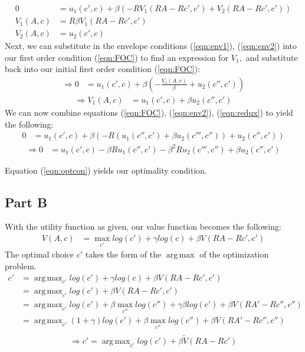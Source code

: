 \documentclass[11pt]{article} %
\DeclareMathOperator*{\argmax}{arg\,max}
\begin{document}
\begin{align}
0&= u_1(c',c) + \beta (-RV_1(RA-Rc',c') + V_2(RA-Rc',c')) \label{eqn:FOC} \\
V_1(A,c) &= R\beta V_1(RA-Rc',c') \label{eqn:env1} \\
V_2(A,c) &= u_2(c',c) \label{eqn:env2}
\end{align}
Next, we can substitute in the envelope conditions (\ref{eqn:env1}), (\ref{eqn:env2}) into our first order condition (\ref{eqn:FOC}) to find an expression for $V_1,$ and substitute back into our initial first order condition (\ref{eqn:FOC}):
\begin{align*}
\Rightarrow 0 &= u_1(c',c) + \beta \left( -\frac{V_1(A,c)}{\beta} + u_2(c'',c')\right)
\end{align*}
\begin{align}
\Rightarrow V_1(A,c) &= u_1(c',c) + \beta u_2(c'',c') \label{eqn:redux}
\end{align}
We can now combine equations (\ref{eqn:FOC}), (\ref{eqn:env2}), (\ref{eqn:redux}) to yield the following:
\begin{align*}
 0&= u_1(c',c) + \beta(-R(u_1(c'',c') + \beta u_2(c''',c'')) + u_2(c'',c'))
\end{align*}
\begin{align}
\Rightarrow 0&= u_1(c',c) - \beta R u_1(c'',c') - \beta^2 R u_2(c''',c'') + \beta u_2(c'',c') \label{eqn:optcon}
\end{align}

Equation (\ref{eqn:optcon}) yields our optimality condition.

\subsection{Part B}
With the utility function as given, our value function becomes the following:
\begin{align*}
V(A,c) &= \max_{c'} log(c') + \gamma log(c) + \beta V(RA-Rc',c')
\end{align*}
The optimal choice $c'$ takes the form of the $\argmax$ of the optimization problem. 
\begin{align*}
c' &= \argmax_{c'}  log(c') + \gamma log(c) + \beta V(RA-Rc',c')\\
&= \argmax_{c'}  log(c') + \beta V(RA-Rc',c')\\
&=  \argmax_{c'}  log(c') + \beta \max_{c''} log(c'') + \gamma \beta log(c')  + \beta V(RA'-Rc'',c'') \\
&= \argmax_{c'}  (1+\gamma) log(c') + \beta \max_{c''} log(c'')   + \beta V(RA'-Rc'',c'') \\
\end{align*}
\begin{equation}
\Rightarrow c' = \argmax_{c'}   log(c') + \beta \tilde{V}(RA-Rc') \label{eqn:vtilde}
\end{equation}
\end{document}
